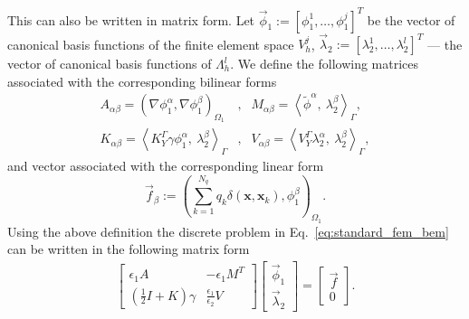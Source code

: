 This can also be written in matrix form. Let $\vec{\phi}_1 := [\phi_1^1, \dots, \phi_1^j]^T$ be the vector of canonical basis
functions of the finite element space $V_{h}^{j}$, %
$\vec{\lambda}_2 := [\lambda_2^1, \dots, \lambda_2^l]^T$ --- the vector of canonical basis
functions of $\Lambda_{h}^{l}$. %
We define the following matrices associated with the corresponding bilinear forms
\begin{align*}
A_{\alpha \beta} = \left(\nabla \phi_1^{\alpha}, \nabla \phi_1^{\beta} \right)_{\Omega_1}  
&,&
M_{\alpha \beta} = \left< \widetilde{\phi}^{\alpha}, \ \lambda^{\beta}_2 \right>_{\Gamma}, \\
K_{\alpha \beta} = \left<K_{Y}^{\Gamma} \gamma \phi^{\alpha}_1, \ \lambda^{\beta}_2 \right>_{\Gamma}
 &,&
V_{\alpha \beta} = \left<V_{Y}^{\Gamma} \lambda^{\alpha}_2, \ \lambda^{\beta}_2 \right>_{\Gamma}, 
\end{align*}
and vector associated with the corresponding linear form
\begin{equation*}
\vec{f}_{\beta} := \left(  \sum_{k=1}^{N_q} q_k\delta(\mathbf{x},\mathbf{x}_k),  \phi_1^{\beta} \right)_{\Omega_1}.
\end{equation*}
Using the above definition the discrete problem in Eq.~\eqref{eq:standard_fem_bem} can be written in the following matrix form
\begin{align}\label{eq:fembem_matrix}
\begin{bmatrix}
\epsilon_1 A &  - \epsilon_1 M^T \\  
\left(\tfrac12 I + K \right) \gamma &  \tfrac{\epsilon_1}{\epsilon_2} V 
\end{bmatrix}
\begin{bmatrix}
\vec{\phi}_1 \\  
\vec{\lambda}_2
\end{bmatrix}
= 
\begin{bmatrix}
\vec{f} \\  
0
\end{bmatrix}.
\end{align}

